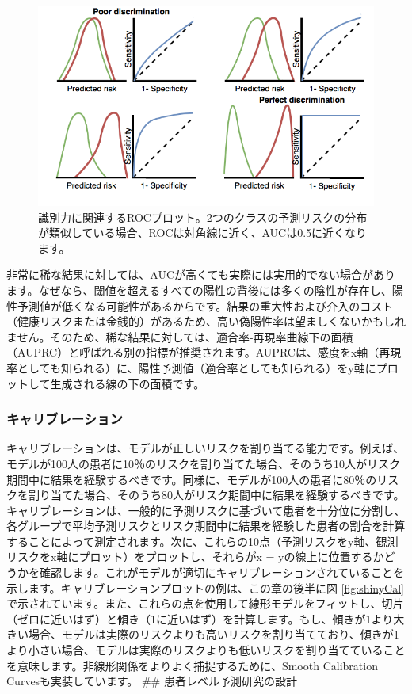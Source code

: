\documentclass[
  11pt]{book}
\theoremstyle{definition}
\theoremstyle{definition}
\theoremstyle{definition}
\theoremstyle{definition}
\theoremstyle{remark}
\begin{document}
\begin{figure}
\includegraphics[width=1\linewidth]{images/PatientLevelPrediction/theory/roctheory} \caption{識別力に関連するROCプロット。2つのクラスの予測リスクの分布が類似している場合、ROCは対角線に近く、AUCは0.5に近くなります。}\label{fig:figuretheoryroctheory}
\end{figure}

非常に稀な結果に対しては、AUCが高くても実際には実用的でない場合があります。なぜなら、閾値を超えるすべての陽性の背後には多くの陰性が存在し、陽性予測値が低くなる可能性があるからです。結果の重大性および介入のコスト（健康リスクまたは金銭的）があるため、高い偽陽性率は望ましくないかもしれません。そのため、稀な結果に対しては、適合率-再現率曲線下の面積（AUPRC）と呼ばれる別の指標が推奨されます。AUPRCは、感度をx軸（再現率としても知られる）に、陽性予測値（適合率としても知られる）をy軸にプロットして生成される線の下の面積です。 

\subsubsection*{キャリブレーション}\label{ux30adux30e3ux30eaux30d6ux30ecux30fcux30b7ux30e7ux30f3}

キャリブレーションは、モデルが正しいリスクを割り当てる能力です。例えば、モデルが100人の患者に10％のリスクを割り当てた場合、そのうち10人がリスク期間中に結果を経験するべきです。同様に、モデルが100人の患者に80％のリスクを割り当てた場合、そのうち80人がリスク期間中に結果を経験するべきです。キャリブレーションは、一般的に予測リスクに基づいて患者を十分位に分割し、各グループで平均予測リスクとリスク期間中に結果を経験した患者の割合を計算することによって測定されます。次に、これらの10点（予測リスクをy軸、観測リスクをx軸にプロット）をプロットし、それらがx = yの線上に位置するかどうかを確認します。これがモデルが適切にキャリブレーションされていることを示します。キャリブレーションプロットの例は、この章の後半に図 \ref{fig:shinyCal} で示されています。また、これらの点を使用して線形モデルをフィットし、切片（ゼロに近いはず）と傾き（1に近いはず）を計算します。もし、傾きが1より大きい場合、モデルは実際のリスクよりも高いリスクを割り当てており、傾きが1より小さい場合、モデルは実際のリスクよりも低いリスクを割り当てていることを意味します。非線形関係をよりよく捕捉するために、Smooth Calibration Curvesも実装しています。 
\#\# 患者レベル予測研究の設計
\end{document}
